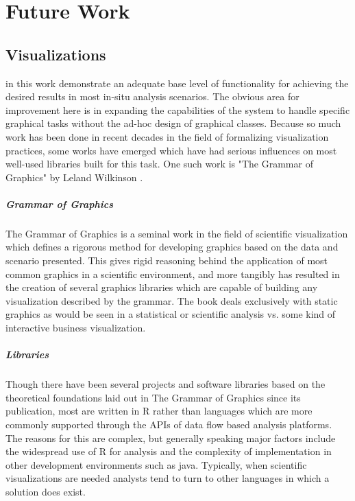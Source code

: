 \chapter{Future Work}
\label{sec:futurework}

\section{Visualizations}
\label{sec:future_viz}
 in this work demonstrate an adequate base level of functionality for achieving the desired results in most in-situ analysis scenarios. The obvious area for improvement here is in expanding the capabilities of the system to handle specific graphical tasks without the ad-hoc design of graphical classes. Because so much work has been done in recent decades in the field of formalizing visualization practices, some works have emerged which have had serious influences on most well-used libraries built for this task. One such work is "The Grammar of Graphics" by Leland Wilkinson \cite{Wilkinson2005}. 

\paragraph{Grammar of Graphics}
The Grammar of Graphics is a seminal work in the field of scientific visualization which defines a rigorous method for developing graphics based on the data and scenario presented.  This gives rigid reasoning behind the application of most common graphics in a scientific environment, and more tangibly has resulted in the creation of several graphics libraries which are capable of building any visualization described by the grammar. The book deals exclusively with static graphics as would be seen in a statistical or scientific analysis vs. some kind of interactive business visualization.

\paragraph{Libraries}
Though there have been several projects and software libraries based on the theoretical foundations laid out in The Grammar of Graphics since its publication, most are written in R rather than languages which are more commonly supported through the APIs of data flow based analysis platforms. The reasons for this are complex, but generally speaking major factors include the widespread use of R for analysis and the complexity of implementation in other development environments such as java. Typically, when scientific visualizations are needed analysts tend to turn to other languages in which a solution does exist.

